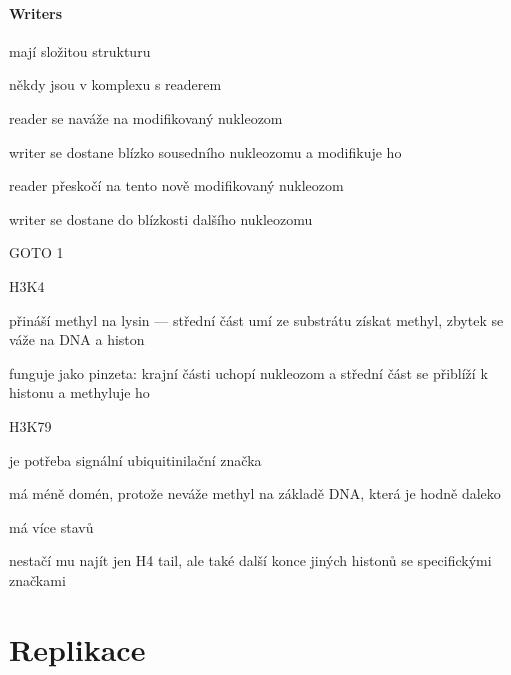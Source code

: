 \documentclass[DIV=8]{scrreprt}
\begin{document}
\paragraph{Writers}
\begin{myItemize}[nosep]
    \item mají složitou strukturu
    \item někdy jsou v komplexu s readerem
\begin{myEnumerate}[nosep]
    \item reader se naváže na modifikovaný nukleozom
    \item writer se dostane blízko sousedního nukleozomu a modifikuje ho
    \item reader přeskočí na tento nově modifikovaný nukleozom
    \item writer se dostane do blízkosti dalšího nukleozomu
    \item GOTO 1
\end{myEnumerate}

    \item H3K4
\begin{myItemize}[nosep]
    \item přináší methyl na lysin --- střed­ní část umí ze sub­strá­tu získat methyl, zbytek se váže na DNA a his­ton
    \item fun­gu­je jako pinze­ta: krajní části uchopí nuk­leo­zom a střed­ní část se při­blíží k his­tonu a methyluje ho
\end{myItemize}

    \item H3K79
\begin{myItemize}[nosep]
    \item je potřeba signální ubiquitinilační značka
    \item má méně domén, pro­tože neváže methyl na zák­ladě DNA, která je hod­ně daleko
    \item má více stavů
    \item nes­tačí mu na­jít jen H4 tail, ale také další konce jiných his­tonů se speci­fick­ý­mi značka­mi
\end{myItemize}

\end{myItemize}



\section{Replikace} \label{Replikace} \FloatBarrier
\end{document}
